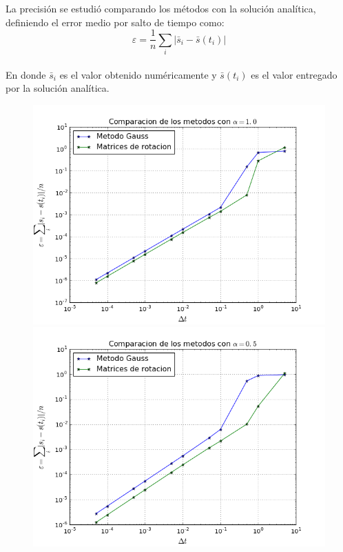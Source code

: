 \documentclass[a4paper, 11pt, spanish]{article}
\begin{document}
La precisión se estudió comparando los métodos con la solución analítica, definiendo el error medio por salto de tiempo como:
\begin{equation*}
\varepsilon =  \frac{1}{n} \sum_i |\bar{s}_i- \bar{s}(t_i)|
\end{equation*}\\
En donde $\bar{s}_i$ es el valor obtenido numéricamente y $\bar{s}(t_i)$ es el valor entregado por la solución analítica.
\begin{figure}[!ht]
\includegraphics[scale=0.4]{img/comparacion_metodos_1.png}
\includegraphics[scale=0.4]{img/comparacion_metodos_5e-1.png}
\end{figure}
\end{document}
